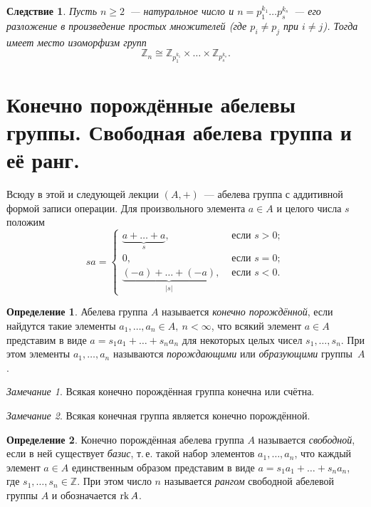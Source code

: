 \documentclass[a4paper, 12pt]{article}
\def\rk{{\rm rk}}%
\def\ZZ{{\mathbb Z}}%
\newtheorem{corollary}{Следствие}
\theoremstyle{definition}
\newtheorem{definition}{Определение}
\theoremstyle{remark}
\newtheorem{remark}{Замечание}
\begin{document}
\begin{corollary} \label{corpr}
Пусть $n \geqslant 2$~--- натуральное число и $n=p_1^{k_1}\ldots
p_s^{k_s}$~--- его разложение в произведение простых множителей
\textup(где $p_i \ne p_j$ при $i \ne j$\textup). Тогда имеет место
изоморфизм групп
$$
\ZZ_n\cong\ZZ_{p_1^{k_1}}\times\ldots\times\ZZ_{p_s^{k_s}}.
$$
\end{corollary}


\section{Конечно порождённые абелевы группы. Свободная абелева группа и её ранг.}

Всюду в этой и следующей лекции $(A,+)$~--- абелева группа с
аддитивной формой записи операции. Для произвольного элемента $a\in
A$ и целого числа $s$ положим
$$
sa =
\begin{cases}
\underbrace{a + \ldots + a}_s, & \text{ если } s > 0; \\
0, & \text{ если } s = 0; \\
\underbrace{(-a) + \ldots + (-a)}_{|s|}, & \text{ если } s < 0.
\end{cases}
$$

\begin{definition}
Абелева группа $A$ называется {\it конечно порождённой}, если
найдутся такие элементы $a_1,\ldots,a_n\in A,\ n < \infty$, что всякий элемент
$a\in A$ представим в виде $a=s_1a_1 + \ldots + s_na_n$ для
некоторых целых чисел $s_1, \ldots, s_n$. При этом элементы $a_1,
\ldots, a_n$ называются {\it порождающими} или {\it образующими}
группы~$A$.
\end{definition}

\begin{remark}
Всякая конечно порождённая группа конечна или счётна.
\end{remark}

\begin{remark}
Всякая конечная группа является конечно порождённой.
\end{remark}

\begin{definition}
Конечно порождённая абелева группа $A$ называется {\it свободной},
если в ней существует {\it базис}, т.\,е. такой набор элементов
$a_1,\ldots, a_n$, что каждый элемент $a\in A$ единственным образом
представим в виде $a=s_1a_1 + \ldots + s_na_n$, где $s_1, \ldots,
s_n \in \ZZ$. При этом число $n$ называется {\it рангом} свободной
абелевой группы $A$ и обозначается $\rk\,A$.
\end{definition}
\end{document}
